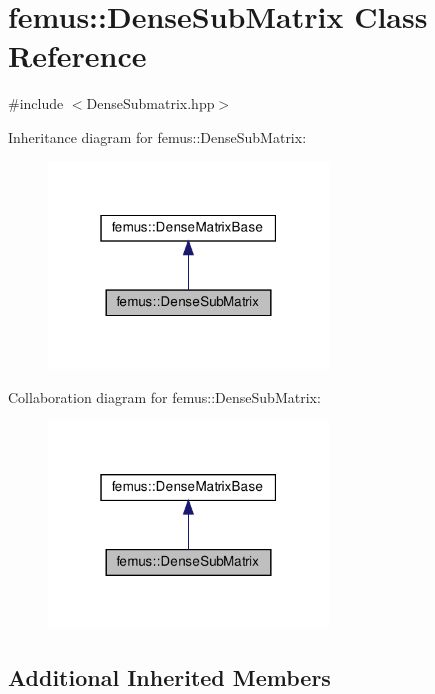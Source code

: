 \hypertarget{classfemus_1_1_dense_sub_matrix}{}\section{femus\+:\+:Dense\+Sub\+Matrix Class Reference}
\label{classfemus_1_1_dense_sub_matrix}


{\ttfamily \#include $<$Dense\+Submatrix.\+hpp$>$}



Inheritance diagram for femus\+:\+:Dense\+Sub\+Matrix\+:
\nopagebreak
\begin{figure}[H]
\begin{center}
\leavevmode
\includegraphics[width=211pt]{classfemus_1_1_dense_sub_matrix__inherit__graph}
\end{center}
\end{figure}


Collaboration diagram for femus\+:\+:Dense\+Sub\+Matrix\+:
\nopagebreak
\begin{figure}[H]
\begin{center}
\leavevmode
\includegraphics[width=211pt]{classfemus_1_1_dense_sub_matrix__coll__graph}
\end{center}
\end{figure}
\subsection*{Additional Inherited Members}


